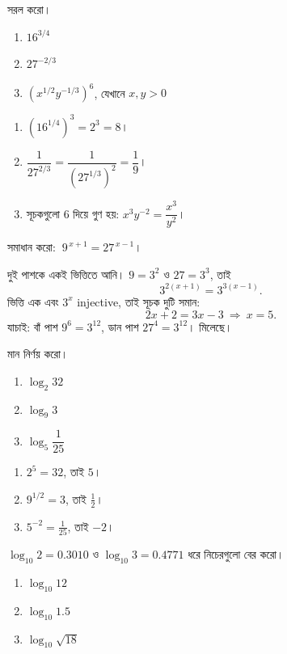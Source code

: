 \documentclass[11pt]{article}
\begin{document}
 সরল করো।
\begin{enumerate}
  \item $16^{3/4}$
  \item $27^{-2/3}$
  \item $\left( x^{1/2} y^{-1/3} \right)^{6}$, যেখানে $x, y > 0$
\end{enumerate}

\begin{sol}
\begin{enumerate}
  \item $\left( 16^{1/4} \right)^{3} = 2^{3} = 8$।
  \item $\dfrac{1}{27^{2/3}} = \dfrac{1}{\left( 27^{1/3} \right)^{2}}
        = \dfrac{1}{9}$।
  \item সূচকগুলো $6$ দিয়ে গুণ হয়:
        $x^{3} y^{-2} = \dfrac{x^{3}}{y^{2}}$।
\end{enumerate}
\end{sol}

 সমাধান করো: $\ 9^{\,x+1} = 27^{\,x-1}$।

\begin{sol}
দুই পাশকে একই ভিত্তিতে আনি। $9 = 3^{2}$ ও $27 = 3^{3}$, তাই
\[
  3^{2(x+1)} = 3^{3(x-1)} .
\]
ভিত্তি এক এবং $3^{x}$ injective, তাই সূচক দুটি সমান:
\[
  2x + 2 = 3x - 3 \ \Longrightarrow\ x = 5 .
\]
যাচাই: বাঁ পাশ $9^{6} = 3^{12}$, ডান পাশ $27^{4} = 3^{12}$। মিলেছে।
\end{sol}

 মান নির্ণয় করো।
\begin{enumerate}
  \item $\log_2 32$
  \item $\log_9 3$
  \item $\log_5 \dfrac{1}{25}$
\end{enumerate}

\begin{sol}
\begin{enumerate}
  \item $2^{5} = 32$, তাই $5$।
  \item $9^{1/2} = 3$, তাই $\tfrac{1}{2}$।
  \item $5^{-2} = \tfrac{1}{25}$, তাই $-2$।
\end{enumerate}
\end{sol}

 $\log_{10} 2 = 0.3010$ ও $\log_{10} 3 = 0.4771$ ধরে নিচেরগুলো বের করো।
\begin{enumerate}
  \item $\log_{10} 12$
  \item $\log_{10} 1.5$
  \item $\log_{10} \sqrt{18}$
\end{enumerate}
\end{document}

